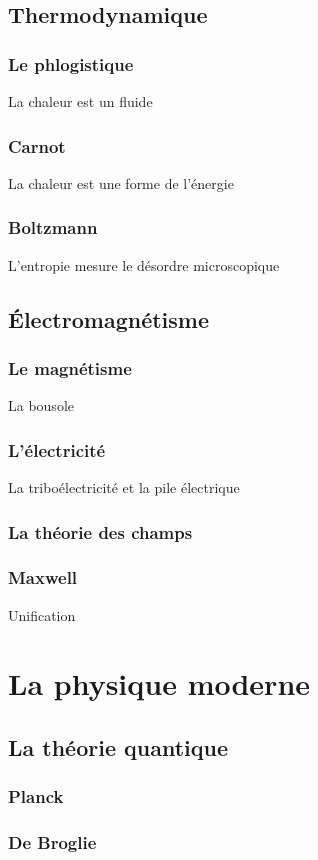 \chapter{Thermodynamique}
  \section{Le phlogistique}
La chaleur est un fluide
  \section{Carnot}
La chaleur est une forme de l'énergie
  \section{Boltzmann}
L'entropie mesure le désordre microscopique

\chapter{Électromagnétisme}
  \section{Le magnétisme}
La bousole
  \section{L'électricité}
La triboélectricité et la pile électrique
  \section{La théorie des champs}
  \section{Maxwell}
Unification

\part{La physique moderne}

\chapter{La théorie quantique}
  \section{Planck}
  \section{De Broglie}

